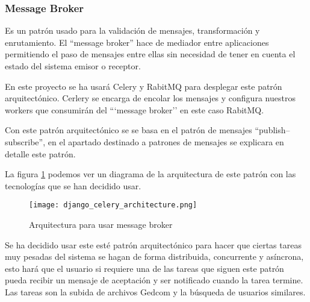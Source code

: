 \subsubsection{Message Broker}
\label{sec:message_broker}
Es un patrón usado para la validación de mensajes, transformación y enrutamiento. El ``message broker'' hace de mediador entre aplicaciones  permitiendo el paso de mensajes entre ellas sin necesidad de tener en cuenta el estado del sistema emisor o receptor.

En este proyecto se ha usará Celery y RabitMQ para desplegar este patrón arquitectónico. Cerlery se encarga de encolar los mensajes y configura nuestros workers que consumirán del ```message broker'' en este caso RabitMQ.

Con este patrón arquitectónico se se basa en el patrón de mensajes  ``publish–subscribe'', en el apartado destinado a patrones de mensajes se explicara en detalle este patrón.

La figura \ref{fig:celery_architecture} podemos ver un diagrama de la arquitectura de este patrón con las tecnologías que se han decidido usar.
\begin{figure}[ht!]
\center
\texttt{[image: django\_celery\_architecture.png]}
\caption{Arquitectura para usar message broker}
\label{fig:celery_architecture}
\end{figure}
 \newpage
 Se ha decidido usar este esté patrón arquitectónico para hacer que ciertas tareas muy pesadas del sistema se hagan de forma distribuida, concurrente y asíncrona, esto hará que el usuario si requiere una de las tareas que siguen este patrón pueda recibir un mensaje de aceptación y ser notificado cuando la tarea termine.
 Las tareas son la subida de archivos Gedcom y la búsqueda de usuarios similares.

\newpage
